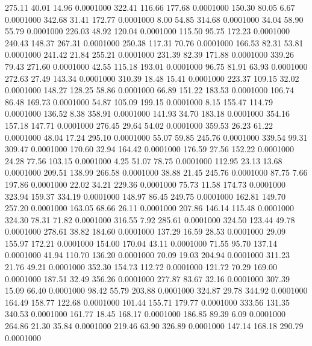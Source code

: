  275.11   40.01   14.96   0.0001000
 322.41  116.66  177.68   0.0001000
 150.30   80.05    6.67   0.0001000
 342.68   31.41  172.77   0.0001000
   8.00   54.85  314.68   0.0001000
  34.04   58.90   55.79   0.0001000
 226.03   48.92  120.04   0.0001000
 115.50   95.75  172.23   0.0001000
 240.43  148.37  267.31   0.0001000
 250.38  117.31   70.76   0.0001000
 166.53   82.31   53.81   0.0001000
 241.42   21.84  255.21   0.0001000
 231.39   82.39  171.88   0.0001000
 339.26   79.43  271.60   0.0001000
  42.55  115.18  193.01   0.0001000
  96.75   81.91   63.93   0.0001000
 272.63   27.49  143.34   0.0001000
 310.39   18.48   15.41   0.0001000
 223.37  109.15   32.02   0.0001000
 148.27  128.25   58.86   0.0001000
  66.89  151.22  183.53   0.0001000
 106.74   86.48  169.73   0.0001000
  54.87  105.09  199.15   0.0001000
   8.15  155.47  114.79   0.0001000
 136.52    8.38  358.91   0.0001000
 141.93   34.70  183.18   0.0001000
 354.16  157.18  147.71   0.0001000
 276.45   29.64   54.02   0.0001000
 359.53   26.23   61.22   0.0001000
  48.04   17.24  295.10   0.0001000
  55.07   59.85  245.76   0.0001000
 339.54   99.31  309.47   0.0001000
 170.60   32.94  164.42   0.0001000
 176.59   27.56  152.22   0.0001000
  24.28   77.56  103.15   0.0001000
   4.25   51.07   78.75   0.0001000
 112.95   23.13   13.68   0.0001000
 209.51  138.99  266.58   0.0001000
  38.88   21.45  245.76   0.0001000
  87.75    7.66  197.86   0.0001000
  22.02   34.21  229.36   0.0001000
  75.73   11.58  174.73   0.0001000
 323.94  159.37  334.19   0.0001000
 148.97   86.45  249.75   0.0001000
 162.81  149.70  257.20   0.0001000
 163.05   68.66   26.11   0.0001000
 207.86  146.14  115.48   0.0001000
 324.30   78.31   71.82   0.0001000
 316.55    7.92  285.61   0.0001000
 324.50  123.44   49.78   0.0001000
 278.61   38.82  184.60   0.0001000
 137.29   16.59   28.53   0.0001000
  29.09  155.97  172.21   0.0001000
 154.00  170.04   43.11   0.0001000
  71.55   95.70  137.14   0.0001000
  41.94  110.70  136.20   0.0001000
  70.09   19.03  204.94   0.0001000
 311.23   21.76   49.21   0.0001000
 352.30  154.73  112.72   0.0001000
 121.72   70.29  169.00   0.0001000
 187.51   32.49  356.26   0.0001000
 277.87   83.67   32.16   0.0001000
 307.39   15.09   66.40   0.0001000
  98.42   55.79  203.88   0.0001000
 324.87   29.78  344.92   0.0001000
 164.49  158.77  122.68   0.0001000
 101.44  155.71  179.77   0.0001000
 333.56  131.35  340.53   0.0001000
 161.77   18.45  168.17   0.0001000
 186.85   89.39    6.09   0.0001000
 264.86   21.30   35.84   0.0001000
 219.46   63.90  326.89   0.0001000
 147.14  168.18  290.79   0.0001000
